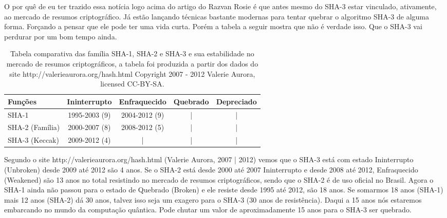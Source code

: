 \documentclass[12pt, a4paper]{article}
\begin{document}
\begin{enumerate}
\begin{enumerate}
    O por quê de eu ter trazido essa notícia logo acima do artigo do Razvan
    Rosie é que antes mesmo do SHA-3 estar vinculado, ativamente, ao mercado de
    resumos criptográfico. Já estão lançando técnicas bastante modernas para
    tentar quebrar o algoritmo SHA-3 de alguma forma. Forçando a pensar que ele
    pode ter uma vida curta. Porém a tabela a seguir mostra que não é verdade
    isso. Que o SHA-3 vai perdurar por um bom tempo ainda.\\

    \begin{table}[ht!]
      \centering
      \begin{tabular}{|l|c|c|c|c|}
        \hline Funções & Ininterrupto & Enfraquecido & Quebrado & Depreciado \\
        \hline SHA-1 & 1995-2003 (9) & 2004-2012 (9) & | & | \\
        \hline SHA-2 (Família) & 2000-2007 (8) & 2008-2012 (5) & | & | \\
        \hline SHA-3 (Keccak) & 2009-2012 (4) & | & | & | \\
        \hline
      \end{tabular}
      \caption{Tabela comparativa das família SHA-1, SHA-2 e SHA-3 e sua
      estabilidade no mercado de resumos criptográficos, a tabela foi produzida
      a partir dos dados do site http://valerieaurora.org/hash.html Copyright
      2007 - 2012 Valerie Aurora, licensed CC-BY-SA.}
    \end{table}

    Segundo o site http://valerieaurora.org/hash.html (Valerie Aurora, 2007 |
    2012) vemos que o SHA-3 está com estado Ininterrupto (Unbroken) desde 2009
    até 2012 são 4 anos. Se o SHA-2 está desde 2000 até 2007 Ininterrupto e
    desde 2008 até 2012, Enfraquecido (Weakened) são 13 anos no total resistindo
    no mercado de resumos criptográficos, sendo que o SHA-2 é de uso oficial no
    Brasil. Agora o SHA-1 ainda não passou para o estado de Quebrado (Broken) e
    ele resiste desde 1995 até 2012, são 18 anos. Se somarmos 18 anos (SHA-1)
    mais 12 anos (SHA-2) dá 30 anos, talvez isso seja um exagero para o SHA-3
    (30 anos de resistência). Daqui a 15 anos nós estaremos embarcando no mundo
    da computação quântica. Pode chutar um valor de aproximadamente 15 anos para
    o SHA-3 ser quebrado.

  \end{enumerate}

\end{enumerate}
\end{document}
